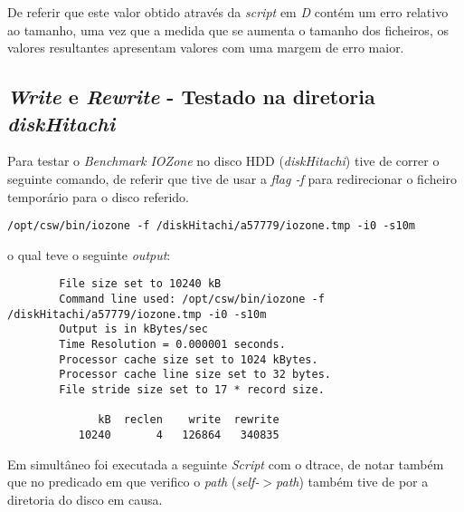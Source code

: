 \documentclass[conference,compsoc]{IEEEtran}
\begin{document}
De referir que este valor obtido através da \textit{script} em \textit{D} contém um erro relativo ao tamanho, uma vez que a medida que se aumenta o tamanho dos ficheiros, os valores resultantes apresentam valores com uma margem de erro maior.


\subsection{\textit{Write} e \textit{Rewrite} - Testado na diretoria \textit{diskHitachi}}

Para testar o \textit{Benchmark IOZone} no disco HDD (\textit{diskHitachi}) tive de correr o seguinte comando, de referir que tive de usar a \textit{flag -f} para redirecionar o ficheiro temporário para o disco referido.

\begin{lstlisting}
/opt/csw/bin/iozone -f /diskHitachi/a57779/iozone.tmp -i0 -s10m
\end{lstlisting}

o qual teve o seguinte \textit{output}:

\begin{lstlisting}
        File size set to 10240 kB
        Command line used: /opt/csw/bin/iozone -f /diskHitachi/a57779/iozone.tmp -i0 -s10m
        Output is in kBytes/sec
        Time Resolution = 0.000001 seconds.
        Processor cache size set to 1024 kBytes.
        Processor cache line size set to 32 bytes.
        File stride size set to 17 * record size.
                                                                                                 
              kB  reclen    write  rewrite    
           10240       4   126864   340835                                                                                                    
\end{lstlisting}

Em simultâneo foi executada a seguinte \textit{Script} com o dtrace, de notar também que no predicado em que verifico o \textit{path} (\textit{self-$>$path}) também tive de por a diretoria do disco em causa.
\end{document}
